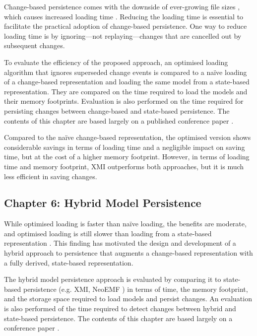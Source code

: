 Change-based persistence comes with the downside of ever-growing file sizes \cite{DBLP:journals/entcs/RobbesL07,DBLP:conf/edoc/KoegelHLHD10}, which causes increased loading time \cite{mens2002state}. Reducing the loading time is essential to facilitate the practical adoption of change-based persistence. One way to reduce loading time is by ignoring—not replaying—changes that are cancelled out by subsequent changes.

To evaluate the efficiency of the proposed approach, an optimised loading algorithm that ignores superseded change events is compared to a naïve loading of a change-based representation and loading the same model from a state-based representation. They are compared on the time required to load the models and their memory footprints. Evaluation is also performed on the time required for persisting changes between change-based and state-based persistence. The contents of this chapter are based largely on a published conference paper \cite{yohannis2018towards}.

Compared to the naïve change-based representation, the optimised version shows considerable savings in terms of loading time and a negligible impact on saving time, but at the cost of a higher memory footprint. However, in terms of loading time and memory footprint, XMI outperforms both approaches, but it is much less efficient in saving changes.

\subsection{Chapter 6: Hybrid Model Persistence}
\label{sec:chapter_5_hybrid_model_persistence}
While optimised loading is faster than naïve loading, the benefits are moderate, and optimised loading is still slower than loading from a state-based representation \cite{DBLP:conf/models/YohannisRPK18}. This finding has motivated the design and development of a hybrid approach to persistence that augments a change-based representation with a fully derived, state-based representation.

The hybrid model persistence approach is evaluated by comparing it to state-based persistence (e.g. XMI, NeoEMF \cite{daniel2016neoemf}) in terms of time, the memory footprint, and the storage space required to load models and persist changes. An evaluation is also performed of the time required to detect changes between hybrid and state-based persistence. The contents of this chapter are based largely on a conference paper \cite{DBLP:conf/models/YohannisRPK18}.

